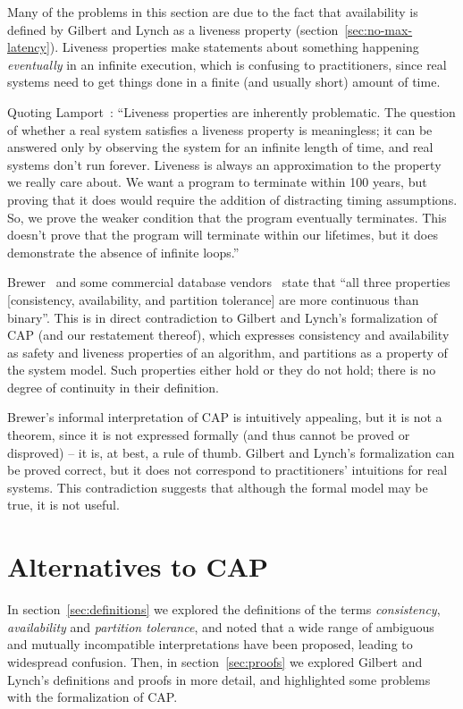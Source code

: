 \documentclass[a4paper,twocolumn,10pt]{article}
\begin{document}
Many of the problems in this section are due to the fact that availability is defined by Gilbert and
Lynch as a liveness property (section~\ref{sec:no-max-latency}). Liveness properties make statements
about something happening \emph{eventually} in an infinite execution, which is confusing to
practitioners, since real systems need to get things done in a finite (and usually short) amount of
time.

Quoting Lamport~\cite{Lamport2000bi}: ``Liveness properties are inherently problematic. The question
of whether a real system satisfies a liveness property is meaningless; it can be answered only by
observing the system for an infinite length of time, and real systems don't run forever. Liveness is
always an approximation to the property we really care about. We want a program to terminate within
100 years, but proving that it does would require the addition of distracting timing assumptions.
So, we prove the weaker condition that the program eventually terminates. This doesn't prove that
the program will terminate within our lifetimes, but it does demonstrate the absence of infinite
loops.''

Brewer~\cite{Brewer2012ba} and some commercial database vendors~\cite{Aerospike2014wa} state that
``all three properties [consistency, availability, and partition tolerance] are more continuous than
binary''. This is in direct contradiction to Gilbert and Lynch's formalization of CAP (and our
restatement thereof), which expresses consistency and availability as safety and liveness properties
of an algorithm, and partitions as a property of the system model. Such properties either hold or
they do not hold; there is no degree of continuity in their definition.

Brewer's informal interpretation of CAP is intuitively appealing, but it is not a theorem, since it
is not expressed formally (and thus cannot be proved or disproved) -- it is, at best, a rule of
thumb. Gilbert and Lynch's formalization can be proved correct, but it does not correspond to
practitioners' intuitions for real systems. This contradiction suggests that although the formal
model may be true, it is not useful.

\section{Alternatives to CAP}\label{sec:alternatives}

In section~\ref{sec:definitions} we explored the definitions of the terms \emph{consistency},
\emph{availability} and \emph{partition tolerance}, and noted that a wide range of ambiguous and
mutually incompatible interpretations have been proposed, leading to widespread confusion. Then,
in section~\ref{sec:proofs} we explored Gilbert and Lynch's definitions and proofs in more detail,
and highlighted some problems with the formalization of CAP.
\end{document}
